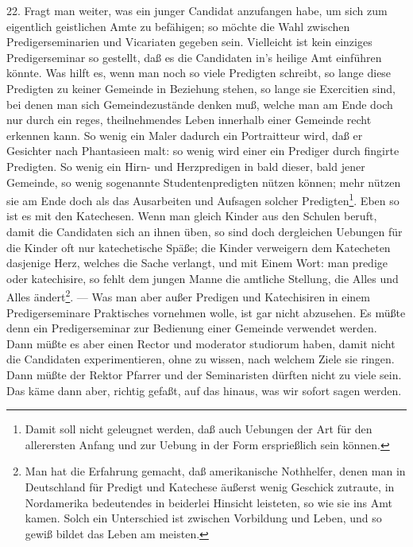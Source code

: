 22. Fragt man weiter, was ein junger Candidat anzufangen habe, um sich zum eigentlich geistlichen Amte zu befähigen; so möchte die Wahl zwischen Predigerseminarien und Vicariaten gegeben sein. Vielleicht ist kein einziges Predigerseminar so gestellt, daß es die Candidaten in’s heilige Amt einführen könnte. Was hilft es, wenn man noch so viele Predigten schreibt, so lange diese Predigten zu keiner Gemeinde in Beziehung stehen, so lange sie Exercitien sind, bei denen man sich Gemeindezustände denken muß, welche man am Ende doch nur durch ein reges, theilnehmendes Leben innerhalb einer Gemeinde recht erkennen kann. So wenig ein Maler dadurch ein Portraitteur wird, daß er Gesichter nach Phantasieen malt: so wenig wird einer ein Prediger durch fingirte Predigten. So wenig ein
Hirn- und Herzpredigen in bald dieser, bald jener Gemeinde, so wenig sogenannte Studentenpredigten nützen können; mehr nützen sie am Ende doch als das Ausarbeiten und Aufsagen solcher Predigten\footnote{Damit soll nicht geleugnet werden, daß auch Uebungen der Art für den allerersten Anfang und zur Uebung in der Form ersprießlich sein können.}. Eben so ist es mit den Katechesen. Wenn man gleich Kinder aus den Schulen beruft, damit die Candidaten sich an ihnen üben, so sind doch dergleichen Uebungen für die Kinder oft nur katechetische Späße; die Kinder verweigern dem Katecheten dasjenige Herz, welches die Sache verlangt, und mit Einem Wort: man predige oder katechisire, so fehlt dem jungen Manne die amtliche Stellung, die Alles und Alles ändert\footnote{Man hat die Erfahrung gemacht, daß amerikanische Nothhelfer, denen man in Deutschland für Predigt und Katechese äußerst wenig Geschick zutraute, in Nordamerika bedeutendes in beiderlei Hinsicht leisteten, so wie sie ins Amt kamen. Solch ein Unterschied ist zwischen Vorbildung und Leben, und so gewiß bildet das Leben am meisten.}. — Was man aber außer Predigen und Katechisiren in einem Predigerseminare Praktisches vornehmen wolle, ist gar nicht abzusehen. Es müßte denn ein Predigerseminar zur Bedienung einer Gemeinde verwendet werden. Dann müßte es aber einen Rector und moderator studiorum haben, damit nicht die Candidaten experimentieren, ohne zu wissen, nach welchem Ziele sie ringen. Dann müßte der Rektor Pfarrer und der Seminaristen dürften nicht zu viele sein. Das käme dann aber, richtig gefaßt, auf das hinaus, was wir sofort sagen werden.


